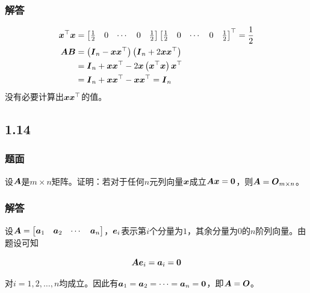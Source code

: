 \documentclass{beamer}
\begin{document}
\begin{frame}
\frametitle{解答}

    \begin{align*}
        \boldsymbol{x}^\top\boldsymbol{x} & =
        \begin{bmatrix}
            \frac{1}{2} & 0 & \cdots & 0 & \frac{1}{2}
        \end{bmatrix}
        \begin{bmatrix}
            \frac{1}{2} & 0 & \cdots & 0 & \frac{1}{2}
        \end{bmatrix}^\top=\frac{1}{2}                                        \\
        \boldsymbol{A}\boldsymbol{B}      & =\left( \boldsymbol{I}_n-\boldsymbol{x}\boldsymbol{x}^\top \right)\left( \boldsymbol{I}_n+2\boldsymbol{x}\boldsymbol{x}^\top \right) \\
                        & =\boldsymbol{I}_n+\boldsymbol{x}\boldsymbol{x}^\top-2\boldsymbol{x}\left( \boldsymbol{x}^\top\boldsymbol{x} \right)\boldsymbol{x}^\top \\
                        & =\boldsymbol{I}_n+\boldsymbol{x}\boldsymbol{x}^\top-\boldsymbol{x}\boldsymbol{x}^\top=\boldsymbol{I}_n
    \end{align*}
没有必要计算出\(\boldsymbol{x}\boldsymbol{x}^\top\)的值。

\end{frame}

\subsection*{1.14}

\begin{frame}
\frametitle{题面}

设\(\boldsymbol{A}\)是\(m\times n\)矩阵。证明：若对于任何\(n\)元列向量\(\boldsymbol{x}\)成立\(\boldsymbol{A}\boldsymbol{x}=\boldsymbol{0}\)，则\(\boldsymbol{A}=\boldsymbol{O}_{m\times n}\)。

\end{frame}

\begin{frame}
\frametitle{解答}

    设\(\boldsymbol{A}=\begin{bmatrix}\boldsymbol{a}_1&\boldsymbol{a}_2&\cdots&\boldsymbol{a}_n\end{bmatrix}\)，\(\boldsymbol{e}_i\)表示第\(i\)个分量为\(1\)，其余分量为\(0\)的\(n\)阶列向量。由题设可知

    \begin{equation*}
        \boldsymbol{A}\boldsymbol{e}_i=\boldsymbol{a}_i=\boldsymbol{0}
    \end{equation*}

    对\(i=1,2,\dots,n\)均成立。因此有\(\boldsymbol{a}_1=\boldsymbol{a}_2=\cdots=\boldsymbol{a}_n=\boldsymbol{0}\)，即\(\boldsymbol{A}=\boldsymbol{O}\)。


\end{frame}
\end{document}
